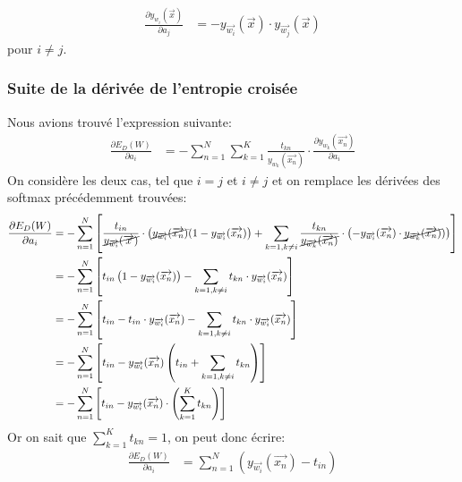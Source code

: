 \begin{equation}
\begin{split}
\frac{\partial y_{w_i}(\overrightarrow{x})} {\partial a_j} &= - y_{\overrightarrow{w_i}}(\overrightarrow{x}) \cdot y_{\overrightarrow{w_j}}(\overrightarrow{x})
\end{split}
\end{equation}
pour $i\neq j$.

\subsubsection{Suite de la dérivée de l'entropie croisée}
Nous avions trouvé l'expression suivante:
\begin{equation}
\begin{split}
	\frac{\partial E_D(W)}{\partial a_i}  &= -\sum_{n=1}^N \sum_{k=1}^K \frac{t_{kn}}{y_{w_k} (\overrightarrow{x_n})} \cdot \frac{\partial y_{w_k} (\overrightarrow{x_n})}{\partial a_i}
\end{split}
\end{equation}
On considère les deux cas, tel que $i=j$ et $i\neq j$ et on remplace les dérivées des softmax précédemment trouvées:
\begin{equation}
\begin{split}
\frac{\partial E_D(W)}{\partial a_i}  &= -\sum_{n=1}^N \left[ \frac{t_{in}}{\cancel{y_{\overrightarrow{w_i}}(\overrightarrow{x})}} \cdot \left( \cancel{y_{\overrightarrow{w_i}}(\overrightarrow{x_n})}(1-y_{\overrightarrow{w_i}}(\overrightarrow{x_n}) \right) + \sum_{k=1, k\neq i} \frac{t_{kn}}{\cancel{y_{\overrightarrow{w_k}}(\overrightarrow{x_n})}} \cdot \left( -y_{\overrightarrow{w_i}}(\overrightarrow{x_n}) \cdot \cancel{y_{\overrightarrow{w_k}}(\overrightarrow{x_n})}) \right)\right]\\
&= -\sum_{n=1}^N \left[ t_{in} \left( 1-y_{\overrightarrow{w_i}}(\overrightarrow{x_n}) \right) - \sum_{k=1, k\neq i} t_{kn} \cdot y_{\overrightarrow{w_i}}(\overrightarrow{x_n}) \right] \\
&= -\sum_{n=1}^N \left[ t_{in} - t_{in} \cdot y_{\overrightarrow{w_i}}(\overrightarrow{x_n}) - \sum_{k=1, k\neq i} t_{kn} \cdot y_{\overrightarrow{w_i}}(\overrightarrow{x_n})  \right] \\
&= -\sum_{n=1}^N  \left[ t_{in} - y_{\overrightarrow{w_i}}(\overrightarrow{x_n}) \left( t_{in} + \sum_{k=1, k\neq i} t_{kn} \right) \right]\\
&= -\sum_{n=1}^N \left[ t_{in} - y_{\overrightarrow{w_i}}(\overrightarrow{x_n}) \cdot \left(  \sum_{k=1}^K t_{kn} \right)  \right]
\end{split}
\end{equation}
Or on sait que $\sum_{k=1}^K t_{kn} = 1$, on peut donc écrire:
\begin{equation}
\begin{split}
\frac{\partial E_D(W)}{\partial a_i}  &=  \sum_{n=1}^N (y_{\overrightarrow{w_i}}(\overrightarrow{x_n}) -  t_{in})
\end{split}
\end{equation}


